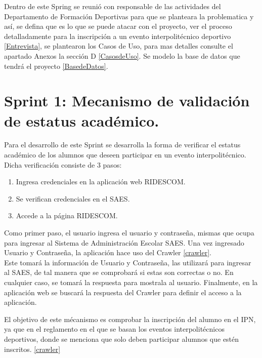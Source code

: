 	\noindent Dentro de este Spring se reunió con responsable de las actividades del Departamento de Formación Deportivas para que se planteara la problematica y así, se defina que es lo que se puede atacar con el proyecto, ver el proceso detalladamente para la inscripción a un evento interpolitécnico deportivo \ref{Entrevista}, se plantearon los Casos de Uso, para mas detalles consulte el apartado Anexos la sección D \ref{CasosdeUso}. Se modelo la base de datos que tendrá el proyecto \ref{BasedeDatos}. 
	\pagebreak
	
	\section{Sprint 1:  Mecanismo de validación de estatus académico.}
	\noindent Para el desarrollo de este Sprint se desarrolla la forma de verificar el estatus académico de los alumnos que deseen participar en un evento interpolitécnico. \\
	Dicha verificación consiste de 3 pasos:
	\begin{enumerate}
		\item Ingresa credenciales en la aplicación web RIDESCOM.
		\item Se verifican credenciales en el SAES.
		\item Accede a la página RIDESCOM.
	\end{enumerate}

	Como primer paso, el usuario ingresa el usuario y contraseña, mismas que ocupa para ingresar al Sistema de Administración Escolar SAES.
	Una vez ingresado Usuario y Contraseña, la aplicación hace uso del Crawler \ref{crawler}. \\
	Este tomará la información de Usuario y Contraseña, las utilizará para ingresar al SAES, de tal manera que se comprobará si estas son correctas o no. En cualquier caso, se tomará la respuesta para mostrala al usuario.
	Finalmente, en la aplicación web se buscará la respuesta del Crawler para definir el acceso a la aplicación.
	
	El objetivo de este mécanismo es comprobar la inscripción del alumno en el IPN, ya que en el reglamento en el que se basan los eventos interpolitécnicos deportivos, donde se menciona que solo deben participar alumnos que estén inscritos. \ref{crawler}
	
	
